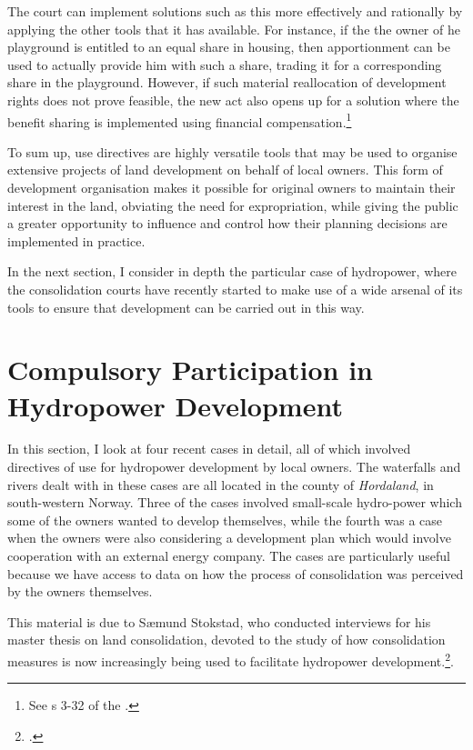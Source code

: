 {The court can implement solutions such as this more effectively and rationally by applying the other tools that it has available. For instance, if the the owner of he playground is entitled to an equal share in housing, then apportionment can be used to actually provide him with such a share, trading it for a corresponding share in the playground. However, if such material reallocation of development rights does not prove feasible, the new act also opens up for a solution where the benefit sharing is implemented using financial compensation.\footnote{See s 3-32 of the \cite{lca13}.}
}

To sum up, use directives are highly versatile tools that may be used to organise extensive projects of land development on behalf of local owners. This form of development organisation makes it possible for original owners to maintain their interest in the land, obviating the need for expropriation, while giving the public a greater opportunity to influence and control  how their planning decisions are implemented in practice. 

In the next section, I consider in depth the particular case of hydropower, where the consolidation courts have recently started to make use of a wide arsenal of its tools to ensure that development can be carried out in this way.

\section{Compulsory Participation in Hydropower Development}\label{sec:lch}

In this section, I look at four recent cases in detail, all of which involved directives of use for hydropower development by local owners. The waterfalls and rivers dealt with in these cases are all located in the county of \emph{Hordaland}, in south-western Norway. Three of the cases involved small-scale hydro-power which some of the owners wanted to develop themselves, while the fourth was a case when the owners were also considering a development plan which would involve cooperation with an external energy company. The cases are particularly useful because we have access to data on how the process of consolidation was perceived by the owners themselves. 

This material is due to Sæmund Stokstad, who conducted interviews for his master thesis on land consolidation, devoted to the study of how consolidation measures is now increasingly being used to facilitate hydropower development.\footcite{stokstad11}.

